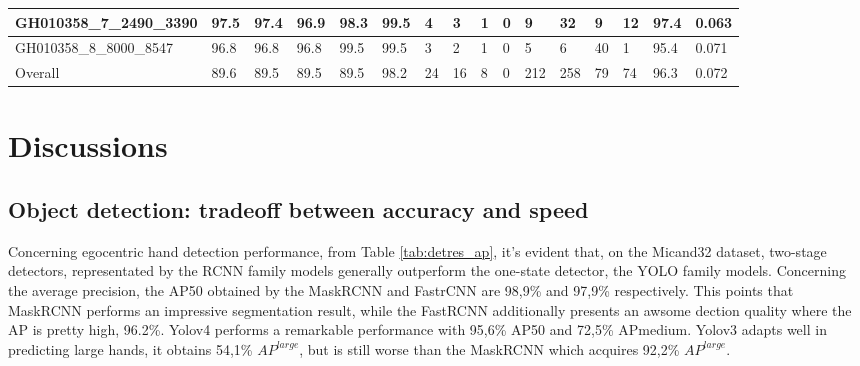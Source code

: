 \begin{table}[]
{\begin{tabular}{|l|l|l|l|l|l|l|l|l|l|l|l|l|l|l|l|}
			GH010358\_7\_2490\_3390   & 97.5       & 97.4      & 96.9      & 98.3                                                   & 99.5                                                   & 4    & 3                                                    & 1                                                    & 0                                                    & 9    & 32   & 9                                                     & 12                                                   & 97.4       & 0.063  \\ \hline
			GH010358\_8\_8000\_8547   & 96.8       & 96.8      & 96.8      & 99.5                                                   & 99.5                                                   & 3    & 2                                                    & 1                                                    & 0                                                    & 5    & 6    & 40                                                    & 1                                                    & 95.4       & 0.071  \\ \hline
			Overall                   & 89.6       & 89.5      & 89.5      & 89.5                                                   & 98.2                                                   & 24   & 16                                                   & 8                                                    & 0                                                    & 212  & 258  & 79                                                    & 74                                                   & 96.3       & 0.072  \\ \hline
		\end{tabular}%
	}
\end{table}
\section{Discussions}
\subsection{Object detection: tradeoff between accuracy and speed}
Concerning egocentric hand detection performance, from Table \ref{tab:detres_ap}, it’s evident that, on the Micand32 dataset, two-stage detectors, representated by the RCNN family models generally outperform the one-state detector, the YOLO family models. Concerning the average precision, the AP50 obtained by the MaskRCNN and FastrCNN are 98,9\% and 97,9\% respectively. This points that MaskRCNN performs an impressive segmentation result, while the FastRCNN additionally presents an awsome dection quality where the AP is pretty high, 96.2\%. Yolov4 performs a remarkable performance with 95,6\% AP50 and 72,5\% APmedium. Yolov3 adapts well in predicting large hands, it obtains 54,1\% \(AP^{large}\), but is still worse than the MaskRCNN which acquires 92,2\% \(AP^{large}\).

